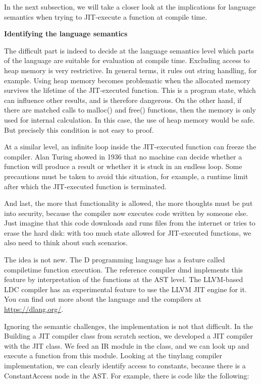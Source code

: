 In the next subsection, we will take a closer look at the implications for language semantics when trying to JIT-execute a function at compile time.\par

\hspace*{\fill} \par %
\textbf{Identifying the language semantics}

The difficult part is indeed to decide at the language semantics level which parts of the language are suitable for evaluation at compile time. Excluding access to heap memory is very restrictive. In general terms, it rules out string handling, for example. Using heap memory becomes problematic when the allocated memory survives the lifetime of the JIT-executed function. This is a program state, which can influence other results, and is therefore dangerous. On the other hand, if there are matched calls to malloc() and free() functions, then the memory is only used for internal calculation. In this case, the use of heap memory would be safe. But precisely this condition is not easy to proof.\par

At a similar level, an infinite loop inside the JIT-executed function can freeze the compiler. Alan Turing showed in 1936 that no machine can decide whether a function will produce a result or whether it is stuck in an endless loop. Some precautions must be taken to avoid this situation, for example, a runtime limit after which the JIT-executed function is terminated.\par

And last, the more that functionality is allowed, the more thoughts must be put into security, because the compiler now executes code written by someone else. Just imagine that this code downloads and runs files from the internet or tries to erase the hard disk: with too much state allowed for JIT-executed functions, we also need to think about such scenarios.\par

The idea is not new. The D programming language has a feature called compiletime
function execution. The reference compiler dmd implements this feature by interpretation of the functions at the AST level. The LLVM-based LDC compiler has an experimental feature to use the LLVM JIT engine for it. You can find out more about the language and the compilers at \url{https://dlang.org/}.\par

Ignoring the semantic challenges, the implementation is not that difficult. In the Building a JIT compiler class from scratch section, we developed a JIT compiler with the JIT class. We feed an IR module in the class, and we can look up and execute a function from this module. Looking at the tinylang compiler implementation, we can clearly identify access to constants, because there is a ConstantAccess node in the AST. For example, there is code like the following:\par

